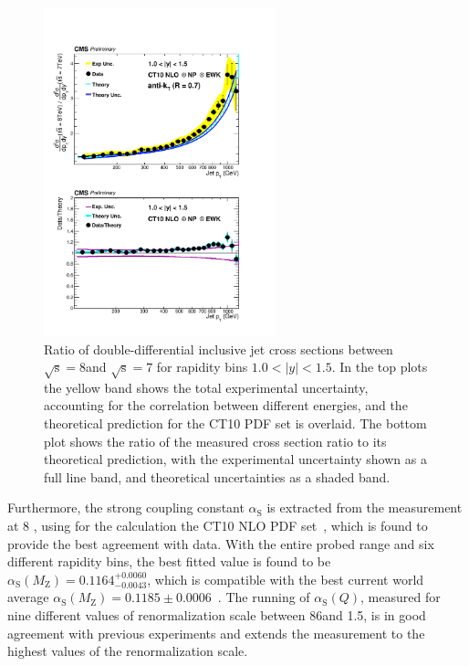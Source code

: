 \documentclass{PoS}
\def\as{\ensuremath{\alpha_\mathrm{S}}\xspace}
\def\asq{\ensuremath{\alpha_\mathrm{S}(Q)}\xspace}
\providecommand{\alpsmz}{\ensuremath{\alpha_\mathrm{S}(M_\mathrm{Z})}\xspace}
\begin{document}
\begin{figure}[hbpt]
  \centering
  \includegraphics[width=0.6\textwidth]{Figure3.pdf}
  \caption{Ratio of double-differential inclusive jet cross sections
    between $\mathrm{\sqrt{s}=8}$\TeV and $\mathrm{\sqrt{s}=7}$\TeV
    for rapidity bins $1.0 < |y| < 1.5$. In the top plots the yellow band shows the total
    experimental uncertainty, accounting for the correlation between
    different energies, and the theoretical prediction for the CT10
    PDF set is overlaid. The bottom plot shows the ratio of the measured
    cross section ratio to its theoretical prediction, with the
    experimental uncertainty shown as a full line band, and
    theoretical uncertainties as a shaded band.}
  \label{fig:ratio8to7}
\end{figure}

Furthermore, the strong coupling constant \as is extracted from the measurement at 8 \TeV, using for the calculation the CT10 NLO PDF
set~\cite{Lai:2010vv}, which is found to provide the best agreement with data.
With the entire probed \pt range and six different rapidity bins, the best fitted value is found to be $\alpsmz =
0.1164^{+0.0060}_{-0.0043}$, which is compatible with the best current world average $\alpsmz =
0.1185\pm0.0006$~\cite{Agashe:2014kda}. The running of \asq, measured for nine different values of renormalization scale 
between 86\GeV and 1.5\TeV, is in good agreement with previous experiments and extends the measurement to the highest
values of the renormalization scale.
\end{document}
